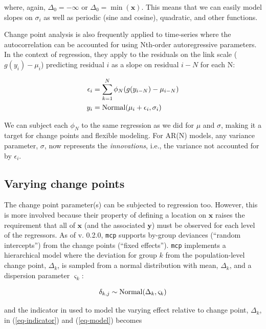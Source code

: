 \documentclass[
  american,
]{article}
\begin{document}
where, again, \(\Delta_0 = -\infty\) or \(\Delta_0 = \min(\mathbf{x})\). This means that we can easily model slopes on \(\sigma_i\) as well as periodic (sine and cosine), quadratic, and other functions.

Change point analysis is also frequently applied to time-series where the autocorrelation can be accounted for using Nth-order autoregressive parameters. In the context of regression, they apply to the residuals on the link scale (\(g(y_i) - \mu_i\)) predicting residual \(i\) as a slope on residual \(i-N\) for each N:

\begin{equation}
\begin{aligned}
  \epsilon_i & = \sum_{k=1}^{N} \phi_N(g(y_{i-N}) - \mu_{i-N}) \\
  y_i & = {\rm Normal}(\mu_i + \epsilon_i, \sigma_i)
\end{aligned}
\end{equation}

We can subject each \(\phi_N\) to the same regression as we did for \(\mu\) and \(\sigma\), making it a target for change points and flexible modeling. For AR(N) models, any variance parameter, \(\sigma\), now represents the \emph{innovations}, i.e., the variance not accounted for by \(\epsilon_i\).

\hypertarget{varying-change-points}{%
\subsection{Varying change points}\label{varying-change-points}}

The change point parameter(s) can be subjected to regression too. However, this is more involved because their property of defining a location on \(\mathbf{x}\) raises the requirement that all of \(\mathbf{x}\) (and the associated \(\mathbf{y}\)) must be observed for each level of the regressors. As of v. 0.2.0, \texttt{mcp} supports by-group deviances (``random intercepts'') from the change points (``fixed effects''). \texttt{mcp} implements a hierarchical model where the deviation for group \(k\) from the population-level change point, \(\Delta_k\), is sampled from a normal distribution with mean, \(\Delta_k\), and a dispersion parameter \(\varsigma_k\):

\begin{equation}
\delta_{k, j} \sim {\rm Normal}(\Delta_k, \varsigma_k)
\end{equation}

and the indicator in used to model the varying effect relative to change point, \(\Delta_k\), in (\ref{eq-indicator}) and (\ref{eq-model}) becomes
\end{document}
